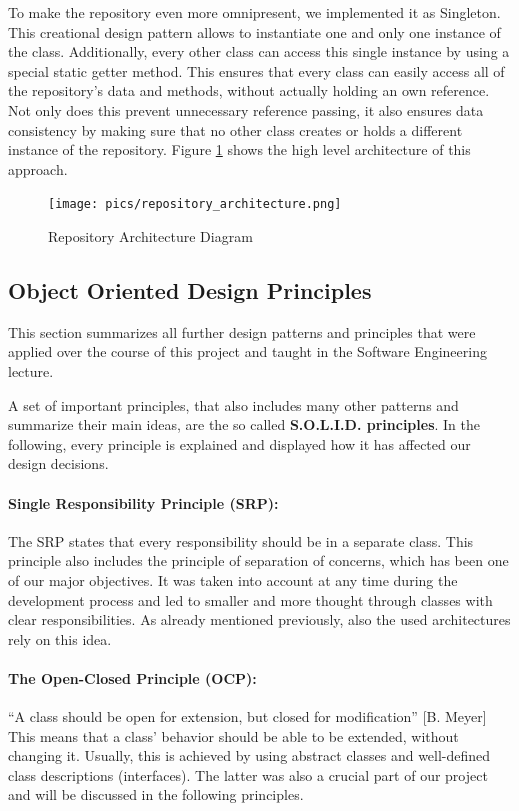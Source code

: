 To make the repository even more omnipresent, we implemented it as Singleton. This creational design pattern allows to instantiate one and only one instance of the class. Additionally, every other class can access this single instance by using a special static getter method. This ensures that every class can easily access all of the repository's data and methods, without actually holding an own reference. Not only does this prevent unnecessary reference passing, it also ensures data consistency by making sure that no other class creates or holds a different instance of the repository. Figure \ref{RepoDiagram} shows the high level architecture of this approach.

\begin{figure}[h]
\begin{center}
\texttt{[image: pics/repository\_architecture.png]}
\caption{Repository Architecture Diagram}
\label{RepoDiagram}
\end{center}
\end{figure}

\subsection{Object Oriented Design Principles}

This section summarizes all further design patterns and principles that were applied over the course of this project and taught in the Software Engineering lecture.

A set of important principles, that also includes many other patterns and summarize their main ideas, are the so called \textbf{S.O.L.I.D. principles}. In the following, every principle is explained and displayed how it has affected our design decisions.


\paragraph{Single Responsibility Principle (SRP):}
The SRP states that every responsibility should be in a separate class. This principle also includes the principle of separation of concerns, which has been one of our major objectives. It was taken into account at any time during the development process and led to smaller and more thought through classes with clear responsibilities. As already mentioned previously, also the used architectures rely on this idea.
\paragraph{The Open-Closed Principle (OCP):}
``A class should be open for extension, but closed for modification'' [B. Meyer]\\
This means that a class' behavior should be able to be extended, without changing it. Usually, this is achieved by using abstract classes and well-defined class descriptions (interfaces). The latter was also a crucial part of our project and will be discussed in the following principles.
